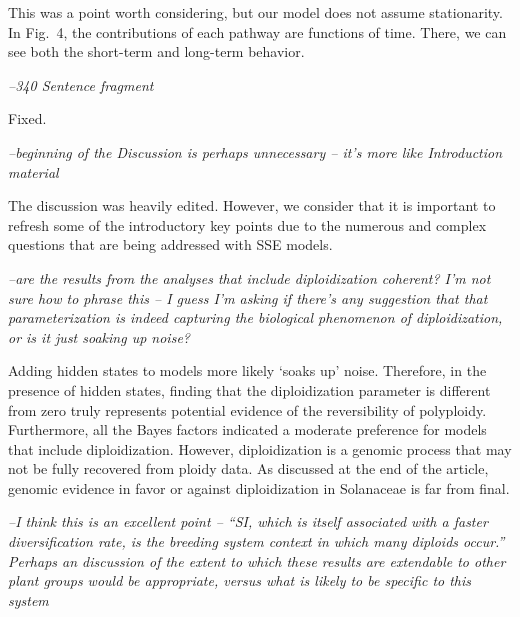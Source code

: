 \documentclass[11pt]{article}
\renewenvironment{quote}{\bigskip\noindent\itshape\ignorespaces}{\smallskip}
\begin{document}
This was a point worth considering, but our model does not assume stationarity. 
In Fig.~4, the contributions of each pathway are functions of time.
There, we can see both the short-term and long-term behavior.


\begin{quote}
--340  Sentence fragment
\end{quote}

Fixed. 


\begin{quote}
--beginning of the Discussion is perhaps unnecessary -- it's more like Introduction material
\end{quote}

The discussion was heavily edited. However, we consider that it is important to refresh some of the introductory key points due to the numerous and complex questions that are being addressed with SSE models. 

\begin{quote}
--are the results from the analyses that include diploidization coherent?
I'm not sure how to phrase this -- I guess I'm asking if there's any suggestion that that parameterization is indeed capturing the biological phenomenon of diploidization, or is it just soaking up noise?
\end{quote}

Adding hidden states to models more likely `soaks up' noise.
Therefore, in the presence of hidden states, finding that the diploidization parameter is different from zero truly represents potential evidence of the reversibility of polyploidy. 
Furthermore, all the Bayes factors indicated a moderate preference for models that include diploidization. %
However, diploidization is a genomic process that may not be fully recovered from ploidy data. 
As discussed at the end of the article, genomic evidence in favor or against diploidization in Solanaceae is far from final.

\begin{quote}
--I think this is an excellent point -- ``SI, which is itself associated with a faster diversification rate, is the breeding system context in which many diploids occur.''
Perhaps an discussion of the extent to which these results are extendable to other plant groups would be appropriate, versus what is likely to be specific to this system
\end{quote}
\end{document}
